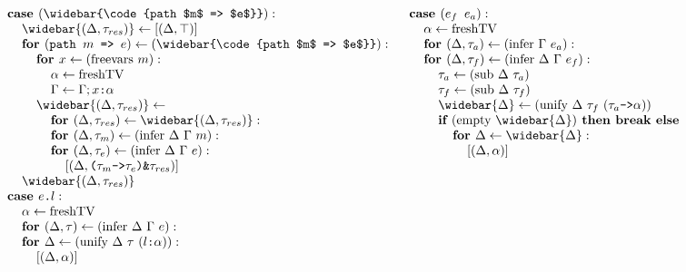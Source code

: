 \documentclass[acmsmall]{acmart}
\begin{document}
\begin{figure*}[h]
\[\begin{array}[t]{@{} l}
    \I \B{case } (\widebar{\code{path $m$ => $e$}})  :  
    \\
    \I\I \widebar{(\Delta, \tau_{res})} \leftarrow [(\Delta, \top)]
    \\
    \I\I \B{for } (\code{path $m$ => $e$}) \leftarrow (\widebar{\code{path $m$ => $e$}}): 
    \\
    \I\I\I \B{for } x \leftarrow (\F{freevars } m):
    \\
    \I\I\I\I \alpha \leftarrow \F{freshTV} 
    \\
    \I\I\I\I \Gamma \leftarrow \Gamma;\code{$x$:$\alpha$}
    \\
    \I\I\I \widebar{(\Delta, \tau_{res})} \leftarrow
    \\
    \I\I\I\I \B{for } (\Delta, \tau_{res}) \leftarrow \widebar{(\Delta, \tau_{res})}: 
    \\
    \I\I\I\I \B{for } (\Delta, \tau_{m}) \leftarrow (\F{infer } \Delta\ \Gamma\ m): 
    \\
    \I\I\I\I \B{for } (\Delta, \tau_{e}) \leftarrow (\F{infer } \Delta\ \Gamma\ e): 
    \\
    \I\I\I\I\I [(\Delta, \code{($\tau_{m}$->$\tau_{e}$)\&$\tau_{res}$})]
    \\
    \I\I \widebar{(\Delta, \tau_{res})}

    \\

    \I \B{case } \code{$e$.$l$} :  
    \\
    \I\I \alpha \leftarrow \F{freshTV}
    \\
    \I\I \B{for } (\Delta, \tau) \leftarrow (\F{infer } \Delta\ \Gamma\ e):
    \\
    \I\I \B{for } \Delta \leftarrow (\F{unify } \Delta\ \tau\ (\code{$l$:$\alpha$})):
    \\
    \I\I\I [(\Delta, \alpha)]
\end{array}
\begin{array}[t]{@{} l}
    \I \B{case } (\code{$e_f$ $e_a$}) :  
    \\
    \I\I \alpha \leftarrow \F{freshTV}
    \\
    \I\I \B{for } (\Delta, \tau_a) \leftarrow (\F{infer } \Gamma\ e_a):
    \\
    \I\I \B{for } (\Delta, \tau_f) \leftarrow (\F{infer } \Delta\ \Gamma\ e_f):
    \\
    \I\I\I \tau_a \leftarrow (\text{sub } \Delta\ \tau_a)
    \\
    \I\I\I \tau_f \leftarrow (\text{sub } \Delta\ \tau_f)
    \\
    \I\I\I \widebar{\Delta} \leftarrow (\F{unify } \Delta\ \tau_f\ (\code{$\tau_a$->$\alpha$}))
    \\
    \I\I\I \B{if } (\F{empty } \widebar{\Delta}) \B{ then } \B{break} \B{ else }
    \\
    \I\I\I\I \B{for } \Delta \leftarrow \widebar{\Delta}:
    \\
    \I\I\I\I\I [(\Delta, \alpha)]


\end{array}\]
\end{figure*}
\end{document}
